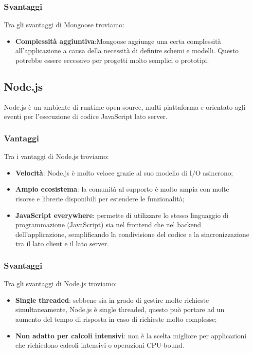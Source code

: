 \subsubsection*{Svantaggi}
Tra gli svantaggi di Mongoose troviamo:
\begin{itemize}
    \item \textbf{Complessità aggiuntiva}:Mongoose aggiunge una certa complessità all'applicazione a causa della necessità di definire schemi e modelli. Questo potrebbe essere eccessivo per progetti molto semplici o prototipi.
\end{itemize}


\subsection*{Node.js}
Node.js è un ambiente di runtime open-source, multi-piattaforma e orientato agli eventi per l'esecuzione di codice JavaScript lato server.

\subsubsection*{Vantaggi}
Tra i vantaggi di Node.js troviamo:
\begin{itemize}
    \item \textbf{Velocità}: Node.js è molto veloce grazie al suo modello di I/O asincrono;
    \item \textbf{Ampio ecosistema}: la comunità al supporto è molto ampia con molte risorse e librerie disponibili per estendere le funzionalità;
    \item \textbf{JavaScript everywhere}: permette di utilizzare lo stesso linguaggio di programmazione (JavaScript) sia nel frontend che nel backend dell'applicazione, semplificando la condivisione del codice e la sincronizzazione tra il lato client e il lato server.
\end{itemize}

\subsubsection*{Svantaggi}
Tra gli svantaggi di Node.js troviamo:
\begin{itemize}
    \item \textbf{Single threaded}: sebbene sia in grado di gestire molte richieste simultaneamente, Node.js è single threaded, questo può portare ad un aumento del tempo di risposta in caso di richieste molto complesse;
    \item \textbf{Non adatto per calcoli intensivi}: non è la scelta migliore per applicazioni che richiedono calcoli intensivi o operazioni CPU-bound.
\end{itemize}



